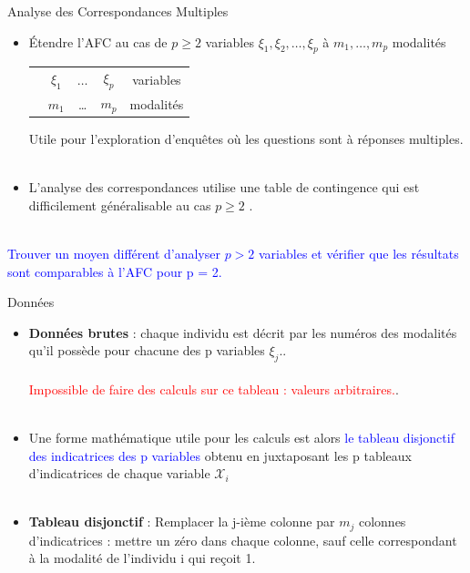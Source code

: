 \documentclass[11pt]{beamer}
\begin{document}
\begin{frame}{ Analyse des Correspondances Multiples }
\begin{itemize}
\item Étendre l'AFC au cas de $p \geq 2$ variables  $\xi_1, \xi_2,  \ldots, \xi_p$ à   $ m_1, \ldots, m_p $ modalités\\

\begin{table}
\begin{tabular}{ccccc}

 & $\xi_1$& $\ldots$ & $ \xi_p$& variables \\
 & $m_1$ & \ldots  &$m_p$ & modalités 
 
\end{tabular} 
\end{table}

 Utile pour l'exploration d'enquêtes où les questions sont à réponses multiples.\\~\\
\item L’analyse des correspondances utilise une table
de contingence qui est difficilement généralisable au cas
$p \geq 2$ .\\~\\
\end{itemize}

\textcolor{blue}{Trouver un moyen différent d'analyser $p > 2$
variables et vérifier que les résultats sont comparables à l’AFC pour p = 2.}
 

\end{frame}



\begin{frame}{ Données}
 
 \begin{itemize}
 \item \textbf{Données brutes} :  chaque individu est décrit par les numéros
des modalités qu’il possède pour chacune des p variables $\xi_j$..\\~\\

\textcolor{red}{Impossible de faire des calculs sur ce tableau :  valeurs arbitraires.}.\\~\\


\item Une forme mathématique utile pour les calculs est alors \textcolor{blue}{le tableau disjonctif des indicatrices des p variables} obtenu en juxtaposant les p tableaux d'indicatrices de chaque variable $\mathcal{X}_i$\\~\\

 \item  \textbf{Tableau disjonctif } : Remplacer la j-ième colonne par $m_j$ colonnes d'indicatrices : mettre  un zéro dans chaque colonne, sauf celle correspondant à la modalité de l’individu i qui
reçoit 1.
 \end{itemize}

 


\end{frame}
\end{document}
